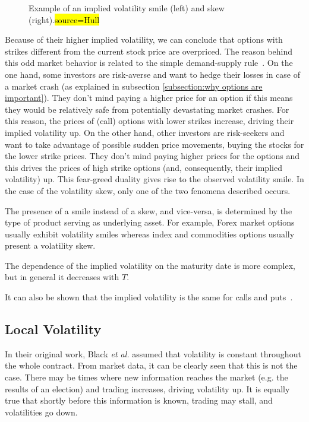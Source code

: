 \begin{figure}[!htb]
  \begin{subfigmatrix}{2}
  \end{subfigmatrix}
  \caption[Example of an implied volatility smile and skew.]{Example of an implied volatility smile (left) and skew (right).\hl{source=Hull}}
  \label{fig:smileskew}
\end{figure}


Because of their higher implied volatility, we can conclude that options with strikes different from the current stock price are overpriced.
The reason behind this odd market behavior is related to the simple demand-supply rule~\cite{Wilmott3}. On the one hand, some investors are risk-averse and want to hedge their losses in case of a market crash (as explained in subsection \ref{subsection:why options are important}). They don't mind paying a higher price for an option if this means they would be relatively safe from potentially devastating market crashes. For this reason, the prices of (call) options with lower strikes increase, driving their implied volatility up. On the other hand, other investors are risk-seekers and want to take advantage of possible sudden price movements, buying the stocks for the lower strike prices. They don't mind paying higher prices for the options and this drives the prices of high strike options (and, consequently, their implied volatility) up. This fear-greed duality gives rise to the observed volatility smile. In the case of the volatility skew, only one of the two fenomena described occurs.



The presence of a smile instead of a skew, and vice-versa, is determined by the type of product serving as underlying asset. For example, Forex market options usually exhibit volatility smiles whereas index and commodities options usually present a volatility skew.

The dependence of the implied volatility on the maturity date is more complex, but in general it decreases with $T$.

It can also be shown that the implied volatility is the same for calls and puts~\cite{Hull}.

\subsection{Local Volatility}
\label{subsection:localvolatility}
In their original work, Black \textit{et al.} assumed that volatility is constant throughout the whole contract. From market data, it can be clearly seen that this is not the case. There may be times where new information reaches the market  (e.g. the results of an election) and trading increases, driving volatility up. It is equally true that shortly before this information is known, trading may stall, and volatilities go down. 

